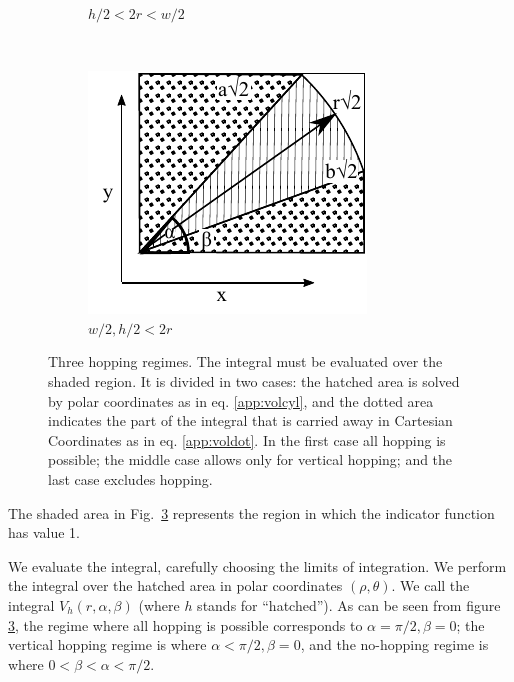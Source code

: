 \documentclass[superscriptaddress,pre,reprint,showpacs,twocolumn]{revtex4-1}
\begin{document}
\begin{figure}[h]
\begin{subfigure}[b]{0.32\textwidth}
          \caption{$h/2<2r<w/2$}
          \label{Caso2}
        \end{subfigure}%
        ~ %
        \begin{subfigure}[b]{0.32\textwidth}
          \centering
          \includegraphics[width=\textwidth]{figures/DiagramaIntegraCaso3.pdf}
          \caption{$w/2,h/2<2r$}
          \label{Caso3}
        \end{subfigure}%
        \caption{Three hopping regimes.
          The integral must be evaluated over the shaded region.
          It is divided in two cases: 
           the hatched area is
          solved by polar coordinates as in eq. \ref{app:volcyl},
          and the dotted area indicates the part of the integral
          that is carried away in Cartesian Coordinates as in eq.
          \ref{app:voldot}.
          In the first case all hopping is possible; the middle case
          allows only for vertical hopping; and the last case excludes hopping.}
\label{CasosIntegra}
\end{figure}
The shaded area in Fig.~\ref{CasosIntegra} represents the region in which the indicator function
has value 1. 

We evaluate the integral, carefully choosing the limits of integration. We perform the integral over the hatched area in polar coordinates $(\rho, \theta)$.
We call the integral $V_h(r,\alpha,\beta)$ (where $h$ stands for ``hatched''). %
As can be seen from figure \ref{CasosIntegra}, the regime where all hopping is possible 
corresponds to $\alpha = \pi/2, \beta=0$; the vertical hopping regime is where
$\alpha < \pi/2, \beta=0$, and the no-hopping regime is where $0 < \beta< \alpha < \pi/2$.
\end{document}
